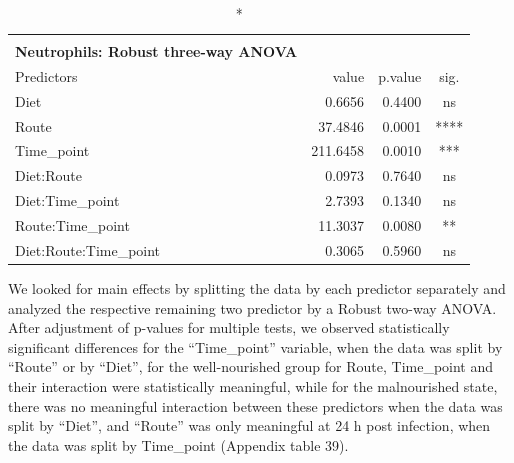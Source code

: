 \documentclass[
  12pt,
  letterpaper,
]{article}
\begin{document}
\begingroup
\fontsize{12.0pt}{14.4pt}\selectfont
\begin{longtable}{l|rrc}
\caption*{
{\large \textbf{Appendix Table 38}} \\ 
{\small \textbf{Neutrophils: Robust three-way ANOVA}}
} \\ 
\toprule
Predictors & {value} & {p.value} & {sig.} \\ 
\midrule\addlinespace[2.5pt]
Diet & 0.6656 & 0.4400 & ns \\ 
Route & 37.4846 & 0.0001 & **** \\ 
Time\_point & 211.6458 & 0.0010 & *** \\ 
Diet:Route & 0.0973 & 0.7640 & ns \\ 
Diet:Time\_point & 2.7393 & 0.1340 & ns \\ 
Route:Time\_point & 11.3037 & 0.0080 & ** \\ 
Diet:Route:Time\_point & 0.3065 & 0.5960 & ns \\ 
\bottomrule
\end{longtable}
\endgroup

We looked for main effects by splitting the data by each predictor separately and analyzed the respective remaining two predictor by a Robust two-way ANOVA. After adjustment of p-values for multiple tests, we observed statistically significant differences for the ``Time\_point'' variable, when the data was split by ``Route'' or by ``Diet'', for the well-nourished group for Route, Time\_point and their interaction were statistically meaningful, while for the malnourished state, there was no meaningful interaction between these predictors when the data was split by ``Diet'', and ``Route'' was only meaningful at 24 h post infection, when the data was split by Time\_point (Appendix table 39).
\end{document}
